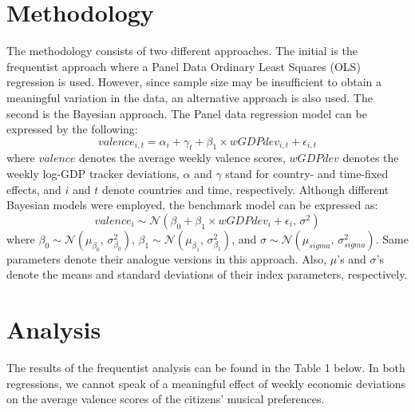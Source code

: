 \documentclass[12pt]{article}
\begin{document}
\section{Methodology}

The methodology consists of two different approaches. The initial is the frequentist approach where a Panel Data Ordinary Least Squares (OLS) regression is used. However, since sample size may be insufficient to obtain a meaningful variation in the data, an alternative approach is also used. The second is the Bayesian approach. The Panel data regression model can be expressed by the following:
\[
valence_{i,t}=\alpha_i + \gamma_t +\beta_1 \times wGDPdev_{i,t} + \epsilon_{i,t}
\]
where $valence$ denotes the average weekly valence scores, $wGDPdev$ denotes the weekly log-GDP tracker deviations, $\alpha$ and $\gamma$ stand for country- and time-fixed effects, and $i$ and $t$ denote countries and time, respectively.
Although different Bayesian models were employed, the benchmark model can be expressed as:
\[
valence_{i}\sim \mathcal{N}(\beta_0+\beta_1 \times wGDPdev_{i} +\epsilon_{i},\,\sigma^{2})
\]
where $\beta_0 \sim \mathcal{N}(\mu_{\beta_0},\,\sigma^{2}_{\beta_0})$, $\beta_1 \sim \mathcal{N}(\mu_{\beta_1},\,\sigma^{2}_{\beta_1})$, and $\sigma \sim \mathcal{N}(\mu_{sigma},\,\sigma^{2}_{sigma})$. Same parameters denote their analogue versions in this approach. Also, $\mu$'s and $\sigma$'s denote the means and standard deviations of their index parameters, respectively. 

\section{Analysis}

The results of the frequentist analysis can be found in the Table 1 below. In both regressions, we cannot speak of a meaningful effect of weekly economic deviations on the average valence scores of the citizens' musical preferences. 
\end{document}

